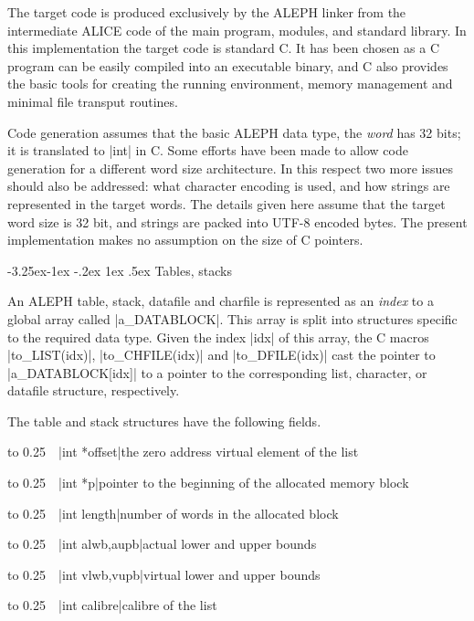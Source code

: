 \documentclass[titlepage]{article}
\makeatletter
\newcommand\A{\textsf{ALEPH}}
\newcommand\I{\textsf{ALICE}}
\newcommand\g[1]{\textsf{#1}}
\renewcommand\subsection{%
\@startsection{subsection}{2}{\z@}%
   {-3.25ex\@plus -1ex \@minus -.2ex}%
   {1ex \@plus .5ex}%
   {\normalfont\normalsize\bfseries}}
\makeatother
\begin{document}
The target code is produced exclusively by the \A{} linker from the
intermediate \I{} code of the main program, modules, and standard
library. In this implementation the target code is standard {\sf C}. It has
been chosen as a {\sf C} program can be easily compiled into an executable
binary, and {\sf C} also provides the basic tools for creating the running
environment, memory management and minimal file transput routines.

Code generation assumes that the basic \A{} data type, the \emph{word} has
32 bits; it is translated to \pp|int| in {\sf C}. Some efforts have been
made to allow code generation for a different word size architecture. In
this respect two more issues should also be addressed: what character
encoding is used, and how strings are represented in the target words. The
details given here assume that the target word size is 32 bit, and strings
are packed into UTF-8 encoded bytes. The present implementation makes no
assumption on the size of {\sf C} pointers.

\subsection{Tables, stacks}\label{subsec:tables-stacks}

An \A{} \g{table}, \g{stack}, \g{datafile} and \g{charfile} is represented
as an \emph{index} to a global array called \pp|a\_DATABLOCK|. This array is
split into structures specific to the required data type. Given the index
\pp|idx| of this array, the {\sf C} macros \pp|to\_LIST(idx)|,
\pp|to\_CHFILE(idx)| and \pp|to\_DFILE(idx)| cast the pointer to
\pp|a\_DATABLOCK[idx]| to a pointer to the corresponding list, character, or
datafile structure, respectively.

The \g{table} and \g{stack} structures have the following fields.
\def\HH{\noindent\hbox to 0.25\linewidth\bgroup~~}

\medskip

\HH\pp|int *offset|\HE the zero address virtual element of the list

\HH\pp|int *p|\HE  pointer to the beginning of the allocated memory block

\HH\pp|int length|\HE number of words in the allocated block

\HH\pp|int alwb,aupb|\HE actual lower and upper bounds

\HH\pp|int vlwb,vupb|\HE virtual lower and upper bounds

\HH\pp|int calibre|\HE  calibre of the list
\end{document}
